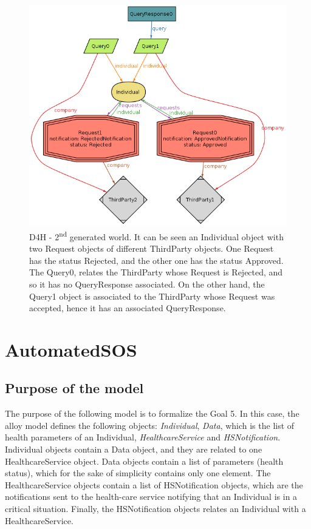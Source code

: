 \documentclass[a4paper, hidelinks, 12pt]{report}
\begin{document}
	\begin{figure}[H]
		\centering
		\includegraphics[width=1\textwidth]{Diagrams/goal_2_world_2.png}
		\caption[D4H - Second generated world]{D4H - 2\textsuperscript{nd} generated world. It can be seen an Individual object with two Request objects of different ThirdParty objects. One Request has the status Rejected, and the other one has the status Approved. The Query0, relates the ThirdParty whose Request is Rejected, and so it has no QueryResponse associated. On the other hand, the Query1 object is associated to the ThirdParty whose Request was accepted, hence it has an associated QueryResponse.}
		\label{fig:goal_2_world_2}
	\end{figure}
	
	\section{AutomatedSOS}
	\subsection{Purpose of the model}
	The purpose of the following model is to formalize the Goal 5. In this case, the alloy model defines the following objects: \textit{Individual}, \textit{Data}, which is the list of health parameters of an Individual, \textit{HealthcareService} and \textit{HSNotification}. Individual objects contain a Data object, and they are related to one HealthcareService object. Data objects contain a list of parameters (health status), which for the sake of simplicity contains only one element. The HealthcareService objects contain a list of HSNotification objects, which are the notifications sent to the health-care service notifying that an Individual is in a critical situation. Finally, the HSNotification objects relates an Individual with a HealthcareService.\\
\end{document}
